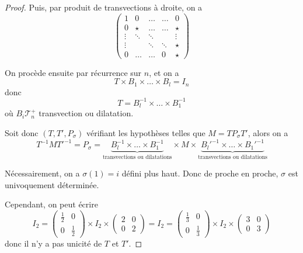 \begin{proof}
    Puis, par produit de transvections à droite, on a 
    \begin{equation}
        \begin{pmatrix}
            1&0 &\dots & \dots& 0\\
            0 & \star & \dots &\dots & \star\\
            \vdots & \ddots & \ddots &  & \vdots\\
            \vdots & & \ddots & \ddots & \star\\
            0 &\dots & \dots & 0 & \star
        \end{pmatrix}
    \end{equation}

    On procède ensuite par récurrence sur $n$, et on a 
    \begin{equation}
        T\times B_{1}\times\dots\times B_{l}=I_{n}
    \end{equation}
    donc 
    \begin{equation}
        T=B_{l}^{-1}\times\dots\times B_{1}^{-1}
    \end{equation}
    où $B_{i}\mathcal{T}_{n}^{+}$ transvection ou dilatation.

    Soit donc $(T,T',P_{\sigma})$ vérifiant les hypothèses telles que $M=TP_{\sigma}T'$, alors on a 
    \begin{equation}
        T^{-1}MT'^{-1}=P_{\sigma}=\underbrace{B_{l}^{-1}\times\dots\times B_{1}^{-1}}_{\text{transvections ou dilatations}}\times M\times\underbrace{B_{l}'^{-1}\times\dots\times B_{1}'^{-1}}_{\text{transvections ou dilatations}}
    \end{equation}

    Nécessairement, on a  $\sigma(1)=i$ défini plus haut. Donc de proche en proche, $\sigma$ est univoquement déterminée.

    Cependant, on peut écrire
    \begin{equation}
        I_{2}=
        \begin{pmatrix}
        \frac{1}{2}&0\\
        0&\frac{1}{2}    
        \end{pmatrix}\times I_{2}\times
        \begin{pmatrix}
            2&0\\
            0&2    
        \end{pmatrix}
        =
        I_{2}=
        \begin{pmatrix}
        \frac{1}{3}&0\\
        0&\frac{1}{3}    
        \end{pmatrix}\times I_{2}\times
        \begin{pmatrix}
            3&0\\
            0&3    
        \end{pmatrix}
    \end{equation}
    donc il n'y a pas unicité de $T$ et $T'$.
\end{proof}

